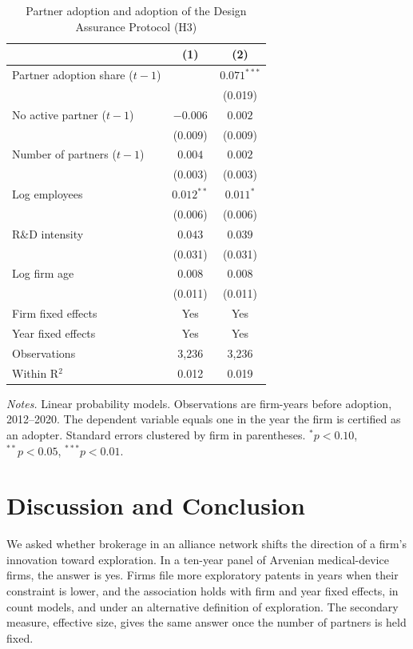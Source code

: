 \documentclass[12pt]{article}
\begin{document}
\begin{table}[!htbp]
\centering
\begin{threeparttable}
\caption{Partner adoption and adoption of the Design Assurance Protocol (H3)}
\label{tab:h3}
\small
\begin{tabular}{lcc}
\toprule
 & (1) & (2) \\
\midrule
Partner adoption share ($t-1$) & & $0.071^{***}$ \\
 & & (0.019) \\
No active partner ($t-1$) & $-0.006$ & $0.002$ \\
 & (0.009) & (0.009) \\
Number of partners ($t-1$) & $0.004$ & $0.002$ \\
 & (0.003) & (0.003) \\
Log employees & $0.012^{**}$ & $0.011^{*}$ \\
 & (0.006) & (0.006) \\
R\&D intensity & $0.043$ & $0.039$ \\
 & (0.031) & (0.031) \\
Log firm age & $0.008$ & $0.008$ \\
 & (0.011) & (0.011) \\
\midrule
Firm fixed effects & Yes & Yes \\
Year fixed effects & Yes & Yes \\
Observations & 3,236 & 3,236 \\
Within R$^2$ & 0.012 & 0.019 \\
\bottomrule
\end{tabular}
\begin{tablenotes}
\footnotesize
\item \textit{Notes.} Linear probability models. Observations are firm-years before adoption, 2012--2020. The dependent variable equals one in the year the firm is certified as an adopter. Standard errors clustered by firm in parentheses. $^{*}p<0.10$, $^{**}p<0.05$, $^{***}p<0.01$.
\end{tablenotes}
\end{threeparttable}
\end{table}

\section{Discussion and Conclusion}

We asked whether brokerage in an alliance network shifts the direction of a firm's innovation toward exploration. In a ten-year panel of Arvenian medical-device firms, the answer is yes. Firms file more exploratory patents in years when their constraint is lower, and the association holds with firm and year fixed effects, in count models, and under an alternative definition of exploration. The secondary measure, effective size, gives the same answer once the number of partners is held fixed.
\end{document}
